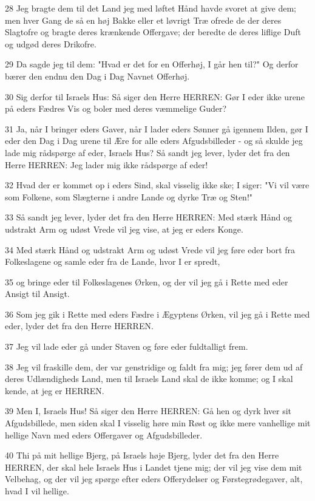 \par 28 Jeg bragte dem til det Land jeg med løftet Hånd havde svoret at give dem; men hver Gang de så en høj Bakke eller et løvrigt Træ ofrede de der deres Slagtofre og bragte deres krænkende Offergave; der beredte de deres liflige Duft og udgød deres Drikofre.
\par 29 Da sagde jeg til dem: "Hvad er det for en Offerhøj, I går hen til?" Og derfor bærer den endnu den Dag i Dag Navnet Offerhøj.
\par 30 Sig derfor til Israels Hus: Så siger den Herre HERREN: Gør I eder ikke urene på eders Fædres Vis og boler med deres væmmelige Guder?
\par 31 Ja, når I bringer eders Gaver, når I lader eders Sønner gå igennem Ilden, gør I eder den Dag i Dag urene til Ære for alle eders Afgudsbilleder - og så skulde jeg lade mig rådspørge af eder, Israels Hus? Så sandt jeg lever, lyder det fra den Herre HERREN: Jeg lader mig ikke rådspørge af eder!
\par 32 Hvad der er kommet op i eders Sind, skal visselig ikke ske; I siger: "Vi vil være som Folkene, som Slægterne i andre Lande og dyrke Træ og Sten!"
\par 33 Så sandt jeg lever, lyder det fra den Herre HERREN: Med stærk Hånd og udstrakt Arm og udøst Vrede vil jeg vise, at jeg er eders Konge.
\par 34 Med stærk Hånd og udstrakt Arm og udøst Vrede vil jeg føre eder bort fra Folkeslagene og samle eder fra de Lande, hvor I er spredt,
\par 35 og bringe eder til Folkeslagenes Ørken, og der vil jeg gå i Rette med eder Ansigt til Ansigt.
\par 36 Som jeg gik i Rette med eders Fædre i Ægyptens Ørken, vil jeg gå i Rette med eder, lyder det fra den Herre HERREN.
\par 37 Jeg vil lade eder gå under Staven og føre eder fuldtalligt frem.
\par 38 Jeg vil fraskille dem, der var genstridige og faldt fra mig; jeg fører dem ud af deres Udlændigheds Land, men til Israels Land skal de ikke komme; og I skal kende, at jeg er HERREN.
\par 39 Men I, Israels Hus! Så siger den Herre HERREN: Gå hen og dyrk hver sit Afgudsbillede, men siden skal I visselig høre min Røst og ikke mere vanhellige mit hellige Navn med eders Offergaver og Afgudsbilleder.
\par 40 Thi på mit hellige Bjerg, på Israels høje Bjerg, lyder det fra den Herre HERREN, der skal hele Israels Hus i Landet tjene mig; der vil jeg vise dem mit Velbehag, og der vil jeg spørge efter eders Offerydelser og Førstegrødegaver, alt, hvad I vil hellige.
